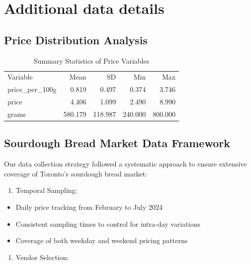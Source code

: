 \documentclass[
  letterpaper,
  DIV=11,
  numbers=noendperiod]{scrartcl}
\providecommand{\tightlist}{%
  \setlength{\itemsep}{0pt}\setlength{\parskip}{0pt}}\usepackage{longtable,booktabs,array}
\begin{document}
\section{Additional data details}\label{sec-appA}

\subsection{Price Distribution
Analysis}\label{price-distribution-analysis-1}

\begin{longtable}[t]{lrrrr}

\caption{\label{tbl-price-detail}Summary Statistics of Price Variables}

\tabularnewline

\\
\toprule
Variable & Mean & SD & Min & Max\\
\midrule
price\_per\_100g & 0.819 & 0.497 & 0.374 & 3.746\\
price & 4.406 & 1.099 & 2.490 & 8.990\\
grams & 580.179 & 118.987 & 240.000 & 800.000\\
\bottomrule

\end{longtable}

\subsection{Sourdough Bread Market Data
Framework}\label{sourdough-bread-market-data-framework}

Our data collection strategy followed a systematic approach to ensure
extensive coverage of Toronto's sourdough bread market:

\begin{enumerate}
\def\labelenumi{\arabic{enumi}.}
\tightlist
\item
  Temporal Sampling:
\end{enumerate}

\begin{itemize}
\item
  Daily price tracking from February to July 2024
\item
  Consistent sampling times to control for intra-day variations
\item
  Coverage of both weekday and weekend pricing patterns
\end{itemize}

\begin{enumerate}
\def\labelenumi{\arabic{enumi}.}
\setcounter{enumi}{1}
\tightlist
\item
  Vendor Selection:
\end{enumerate}
\end{document}
